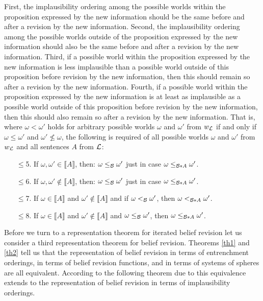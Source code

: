 First, the implausibility ordering among the possible worlds within the proposition expressed by the new information should be the same before and after a revision by the new information. Second, the implausibility ordering among the possible worlds outside of the proposition expressed by the new information should also be the same before and after a revision by the new information. Third, if a possible world within the proposition expressed by the new information is less implausible than a possible world outside of this proposition before revision by the new information, then this should remain so after a revision by the new information. Fourth, if a possible world within the proposition expressed by the new information is at least as implausible as a possible world outside of this proposition before revision by the new information, then this should also remain so after a revision by the new information. That is, where $\omega<\omega'$ holds for arbitrary possible worlds $\omega$ and $\omega'$ from $w_{\cal L}$ if and only if $\omega\leq\omega'$ and $\omega'\not\leq\omega$, the following is required of all possible worlds $\omega$ and $\omega'$ from $w_{\cal L}$ and all sentences $A$ from $\cal L$:
\begin{enumerate}
\item[$\leq$5.] If $\omega,\omega'\in\llbracket A\rrbracket$, then: $\omega\leq_{\cal B}\omega'$ just in case $\omega\leq_{\begin{cal}B\end{cal}*A}\omega'$.
\item[$\leq$6.] If $\omega,\omega'\not\in\llbracket A\rrbracket$, then: $\omega\leq_{\cal B}\omega'$ just in case $\omega\leq_{\begin{cal}B\end{cal}*A}\omega'$.
\item[$\leq$7.] If $\omega\in\llbracket A\rrbracket$ and $\omega'\not\in\llbracket A\rrbracket$ and if $\omega<_{\cal B}\omega'$, then $\omega<_{\begin{cal}B\end{cal}*A}\omega'$.
\item[$\leq$8.] If $\omega\in\llbracket A\rrbracket$ and $\omega'\not\in\llbracket A\rrbracket$ and $\omega\leq_{\cal B}\omega'$, then $\omega\leq_{\begin{cal}B\end{cal}*A}\omega'$.
\end{enumerate}
Before we turn to a representation theorem for iterated belief revision let us consider a third representation theorem for belief revision. Theorems \ref{th1} and \ref{th2} tell us that the representation of belief revision in terms of entrenchment orderings, in terms of belief revision functions, and in terms of systems of spheres are all equivalent. According to the following theorem due to \citet{g88} this equivalence extends to the representation of belief revision in terms of implausibility orderings.
